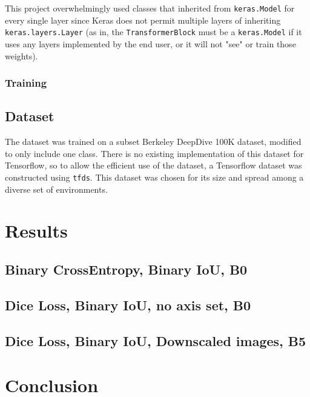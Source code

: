 \documentclass[12pt]{article}
\begin{document}
    This project overwhelmingly used classes that inherited from \texttt{keras.Model} for every single layer since Keras does not permit multiple layers of inheriting \texttt{keras.layers.Layer} (as in, the \texttt{TransformerBlock} must be a \texttt{keras.Model} if it uses any layers implemented by the end user, or it will not "see" or train those weights).

    \subsubsection*{Training}

    \subsection*{Dataset}

    The dataset was trained on a subset Berkeley DeepDive 100K dataset, modified to only include one class. There is no existing implementation of this dataset for Tensorflow, so to allow the efficient use of the dataset, a Tensorflow dataset was constructed using \texttt{tfds}. This dataset was chosen for its size and spread among a diverse set of environments.

    \section{Results}

    \subsection{Binary CrossEntropy, Binary IoU, B0}

    \subsection*{Dice Loss, Binary IoU, no axis set, B0}

    \subsection*{Dice Loss, Binary IoU, Downscaled images, B5}

    \section{Conclusion}

    \newpage
    
\end{document}
